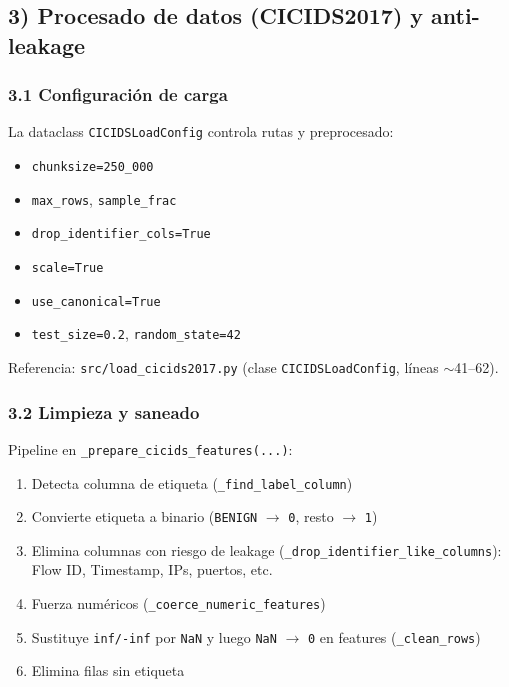 ﻿\documentclass[12pt,a4paper]{article}
\begin{document}
\subsection{3) Procesado de datos (CICIDS2017) y anti-leakage}

\subsubsection{3.1 Configuración de carga}

La dataclass \texttt{CICIDSLoadConfig} controla rutas y preprocesado:

\begin{itemize}
  \item \texttt{chunksize=250\_000}
  \item \texttt{max\_rows}, \texttt{sample\_frac}
  \item \texttt{drop\_identifier\_cols=True}
  \item \texttt{scale=True}
  \item \texttt{use\_canonical=True}
  \item \texttt{test\_size=0.2}, \texttt{random\_state=42}
\end{itemize}

Referencia: \verb|src/load_cicids2017.py| (clase \texttt{CICIDSLoadConfig}, líneas $\sim$41--62).

\subsubsection{3.2 Limpieza y saneado}

Pipeline en \verb|_prepare_cicids_features(...)|:

\begin{enumerate}
  \item Detecta columna de etiqueta (\verb|_find_label_column|)
  \item Convierte etiqueta a binario (\texttt{BENIGN} $\to$ \texttt{0}, resto $\to$ \texttt{1})
  \item Elimina columnas con riesgo de leakage (\verb|_drop_identifier_like_columns|):
        Flow ID, Timestamp, IPs, puertos, etc.
  \item Fuerza numéricos (\verb|_coerce_numeric_features|)
  \item Sustituye \texttt{inf/-inf} por \texttt{NaN} y luego \texttt{NaN} $\to$ \texttt{0} en
        features (\verb|_clean_rows|)
  \item Elimina filas sin etiqueta
\end{enumerate}
\end{document}
